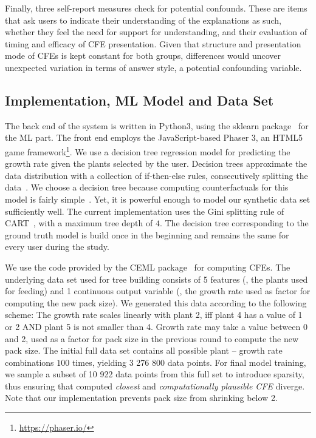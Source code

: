 Finally, three self-report measures check for potential confounds. 
These are items that ask users to indicate their understanding of the explanations as such, whether they feel the need for support for understanding, and their evaluation of timing and efficacy of \gls{CFE} presentation.
Given that structure and presentation mode of \glspl{CFE} is kept constant for both groups, differences would uncover unexpected variation in terms of answer style, a potential confounding variable.

\subsection{Implementation, ML Model and Data Set}
The back end of the system is written in Python3, using the sklearn package~\citep{pedregosa_scikit-learn_2011} for the \gls{ML} part. The front end employs the JavaScript-based Phaser 3, an HTML5 game framework\footnote{\url{https://phaser.io/}}.
We use a decision tree regression model for predicting the growth rate given the plants selected by the user.
Decision trees approximate the data distribution with a collection of if-then-else rules, consecutively splitting the data~\citep{shalev-shwartz_understanding_2014}.
We choose a decision tree because computing counterfactuals for this model is fairly simple~\citep{artelt_computation_2019}.
Yet, it is powerful enough to model our synthetic data set sufficiently well.
The current implementation uses the Gini splitting rule of CART~\citep{breiman_classification_1984}, with a maximum tree depth of $4$.
The decision tree corresponding to the ground truth model is build once in the beginning and remains the same for every user during the study. 

We use the code provided by the CEML package~\citep{artelt_ceml_2019} for computing \glspl{CFE}.
The underlying data set used for tree building consists of 5 features (\ie, the plants used for feeding) and 1 continuous output variable (\ie, the growth rate used as factor for computing the new pack size).
We generated this data according to the following scheme: The growth rate scales linearly with plant 2, iff plant 4 has a value of 1 or 2 AND plant 5 is not smaller than 4. 
Growth rate may take a value between 0 and 2, used as a factor for pack size in the previous round to compute the new pack size.
The initial full data set contains all possible plant -- growth rate combinations $100$ times, yielding 3 276 800 data points. 
For final model training, we sample a subset of 10 922 data points from this full set to introduce sparsity, thus ensuring that computed \textit{closest} and \textit{computationally plausible \gls{CFE}} diverge.
Note that our implementation prevents pack size from shrinking below 2.

